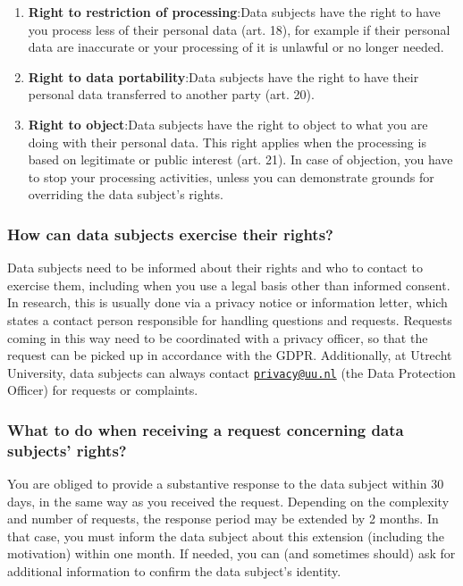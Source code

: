 \documentclass[
]{book}
\providecommand{\tightlist}{%
  \setlength{\itemsep}{0pt}\setlength{\parskip}{0pt}}
\begin{document}
\begin{enumerate}
\def\labelenumi{\arabic{enumi}.}
\setcounter{enumi}{4}
\tightlist
\item
  \textbf{Right to restriction of processing}:Data subjects have the right to have you process less of their personal data (art. 18), for example if their personal data are inaccurate or your processing of it is unlawful or no longer needed.
\item
  \textbf{Right to data portability}:Data subjects have the right to have their personal data transferred to another party (art. 20).
\item
  \textbf{Right to object}:Data subjects have the right to object to what you are doing with their personal data. This right applies when the processing is based on legitimate or public interest (art. 21). In case of objection, you have to stop your processing activities, unless you can demonstrate grounds for overriding the data subject's rights.
\end{enumerate}

\hypertarget{how-can-data-subjects-exercise-their-rights}{%
\subsubsection{How can data subjects exercise their rights?}\label{how-can-data-subjects-exercise-their-rights}}

Data subjects need to be informed about their rights and who to contact to exercise them, including when you use a legal basis other than informed consent. In research, this is usually done via a privacy notice or information letter, which states a contact person responsible for handling questions and requests. Requests coming in this way need to be coordinated with a privacy officer, so that the request can be picked up in accordance with the GDPR. Additionally, at Utrecht University, data subjects can always contact \href{mailto:privacy@uu.nl}{\nolinkurl{privacy@uu.nl}} (the Data Protection Officer) for requests or complaints.

\hypertarget{what-to-do-when-receiving-a-request-concerning-data-subjects-rights}{%
\subsubsection{What to do when receiving a request concerning data subjects' rights?}\label{what-to-do-when-receiving-a-request-concerning-data-subjects-rights}}

You are obliged to provide a substantive response to the data subject within 30 days, in the same way as you received the request. Depending on the complexity and number of requests, the response period may be extended by 2 months. In that case, you must inform the data subject about this extension (including the motivation) within one month. If needed, you can (and sometimes should) ask for additional information to confirm the data subject's identity.
\end{document}
